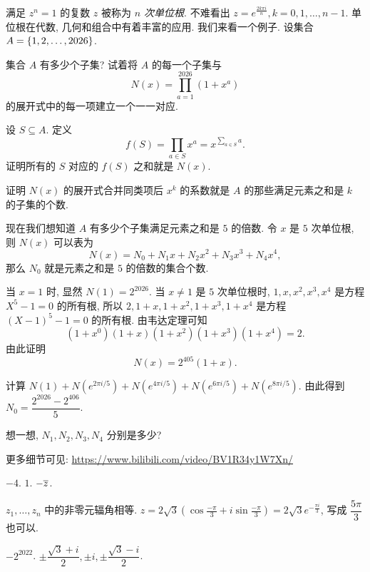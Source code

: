 \begin{homework}
    \item 满足 $z^n=1$ 的复数 $z$ 被称为 \emph{$n$ 次单位根}.
    不难看出 $z=e^{\frac{2k\pi i}n},k=0,1,\dots,n-1$.
    单位根在代数, 几何和组合中有着丰富的应用. 我们来看一个例子.
    设集合 $A={\left\{1,2,\dots,2026\right\}}$.

    \begin{exlist}
      \item 集合 $A$ 有多少个子集? 试着将 $A$ 的每一个子集与
      \[N(x)=\prod_{a=1}^{2026}(1+x^a)\]
      的展开式中的每一项建立一个一一对应.
      \item 设 $S\subseteq A$. 定义
      \[f(S)=\prod_{a\in S}x^a=x^{\sum_{a\in S}a}.\]
      证明所有的 $S$ 对应的 $f(S)$ 之和就是 $N(x)$.
      \item 证明 $N(x)$ 的展开式合并同类项后 $x^k$ 的系数就是 $A$ 的那些满足元素之和是 $k$ 的子集的个数.
      \item 现在我们想知道 $A$ 有多少个子集满足元素之和是 $5$ 的倍数.
    令 $x$ 是 $5$ 次单位根, 则 $N(x)$ 可以表为
    \[N(x)=N_0+N_1x+N_2x^2+N_3x^3+N_4x^4,\]
      那么 $N_0$ 就是元素之和是 $5$ 的倍数的集合个数.
      \item 当 $x=1$ 时, 显然 $N(1)=2^{2026}$.
      当 $x\neq 1$ 是 $5$ 次单位根时, $1,x,x^2,x^3,x^4$ 是方程 $X^5-1=0$ 的所有根, 所以 $2,1+x,1+x^2,1+x^3,1+x^4$ 是方程 $(X-1)^5-1=0$ 的所有根. 由韦达定理可知
      \[(1+x^0)(1+x)(1+x^2)(1+x^3)(1+x^4)=2.\]
      由此证明
      \[N(x)=2^{405}(1+x).\]
      \item 计算 $N(1)+N(e^{2\pi i/5})+N(e^{4\pi i/5})+N(e^{6\pi i/5})+N(e^{8\pi i/5})$. 由此得到 $N_0=\dfrac{2^{2026}-2^{406}}5$.
      \item 想一想, $N_1,N_2,N_3,N_4$ 分别是多少?
    \end{exlist}
    更多细节可见: \url{https://www.bilibili.com/video/BV1R34y1W7Xn/}
\end{homework}


\sectionExerciseAnswer

\exans $-4$.
\exans $1$.
\exans $-\overline z$.

\exans $z_1,\dots,z_n$ 中的非零元辐角相等.
\exans $\displaystyle z=2\sqrt3\left(\cos\frac{-\pi}3+i\sin\frac{-\pi}3\right)=2\sqrt3e^{-\frac{\pi i}3}$, 写成 $\dfrac{5\pi}3$ 也可以.

\exans $-2^{2022}$.
\exans $\pm\dfrac{\sqrt3+i}2,\pm i,\pm\dfrac{\sqrt3-i}2$.

